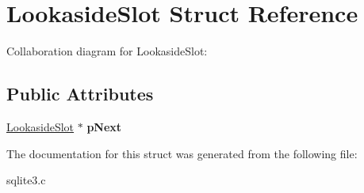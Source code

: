 \hypertarget{structLookasideSlot}{}\section{Lookaside\+Slot Struct Reference}
\label{structLookasideSlot}


Collaboration diagram for Lookaside\+Slot\+:
\subsection*{Public Attributes}
\begin{DoxyCompactItemize}
\item 
\hyperlink{structLookasideSlot}{Lookaside\+Slot} $\ast$ {\bfseries p\+Next}\hypertarget{structLookasideSlot_a3c3dd4a770ded51a68e8a651eba40f66}{}\label{structLookasideSlot_a3c3dd4a770ded51a68e8a651eba40f66}

\end{DoxyCompactItemize}


The documentation for this struct was generated from the following file\+:\begin{DoxyCompactItemize}
\item 
sqlite3.\+c\end{DoxyCompactItemize}
